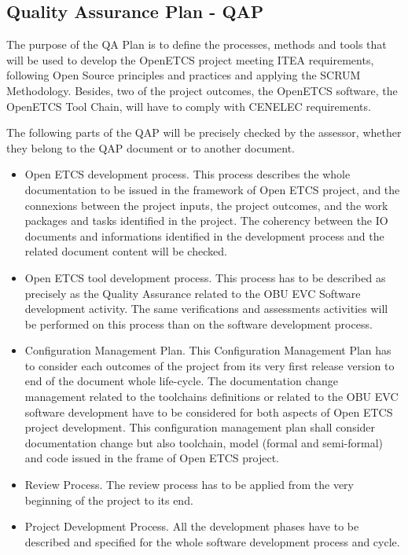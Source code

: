 \documentclass{template/openetcs_article}
\begin{document}
\subsection{Quality Assurance Plan - QAP}
The purpose of the QA Plan is to define the processes, methods and tools that will be used to develop the OpenETCS project meeting ITEA requirements, following Open Source principles and practices and applying the SCRUM Methodology. Besides, two of the project outcomes, the OpenETCS software, the OpenETCS Tool Chain, will have to comply with CENELEC requirements.

The following parts of the QAP will be precisely checked by the assessor, whether they belong to the QAP document or to another document.
\begin{itemize}
\item  Open ETCS development process. This process describes the whole documentation to be issued in the framework of Open ETCS project, and the connexions between the project inputs, the project outcomes, and the work packages and tasks identified in the project. The coherency between the IO documents and informations identified in the development process and the related document content will be checked.
\item  Open ETCS tool development process. This process has to be described as precisely as the Quality Assurance related to the OBU EVC Software development activity. The same verifications and assessments activities will be performed on this process than on the software development process.
\item Configuration Management Plan. This Configuration Management Plan has to consider each outcomes of the project from its very first release version to end of the document whole life-cycle. The documentation change management related to the toolchains definitions or related to the OBU EVC software development have to be considered for both aspects of Open ETCS project development. This configuration management plan shall consider documentation change but also toolchain, model (formal and semi-formal) and code issued in the frame of Open ETCS project.
\item Review Process. The review process has to be applied from the very beginning of the project to its end.
\item Project Development Process. All the development phases have to be described and specified for the whole software development process and cycle.
\end{itemize}
\end{document}
